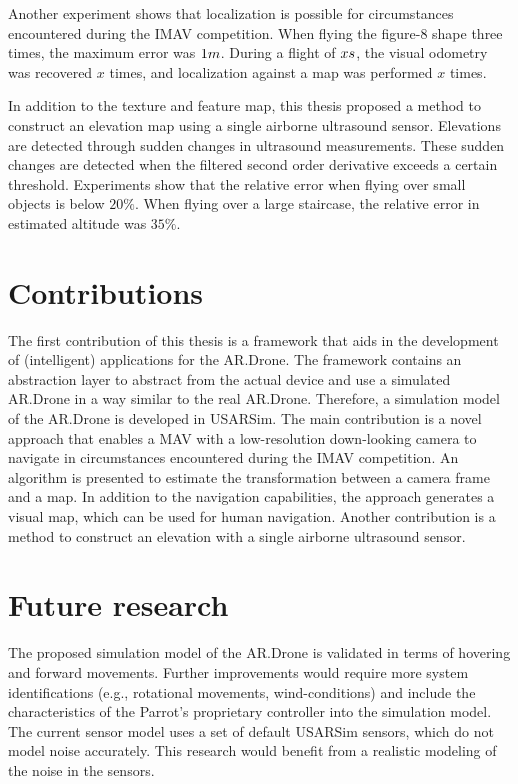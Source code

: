 Another experiment shows that localization is possible for circumstances encountered during the IMAV competition.
When flying the figure-8 shape three times, the maximum error was $1\small{m}$.
During a flight of $x\small{s}$, the visual odometry was recovered $x$ times, and localization against a map was performed $x$ times.

In addition to the texture and feature map, this thesis proposed a method to construct an elevation map using a single airborne ultrasound sensor.
Elevations are detected through sudden changes in ultrasound measurements.
These sudden changes are detected when the filtered second order derivative exceeds a certain threshold.
Experiments show that the relative error when flying over small objects is below $20\%$.
When flying over a large staircase, the relative error in estimated altitude was $35\%$.









\section{Contributions}
\label{sec:conclusions-contributions}

The first contribution of this thesis is a framework that aids in the development of (intelligent) applications for the AR.Drone.
The framework contains an abstraction layer to abstract from the actual device and use a simulated AR.Drone in a way similar to the real AR.Drone.
Therefore, a simulation model of the AR.Drone is developed in USARSim.
The main contribution is a novel approach that enables a MAV with a low-resolution down-looking camera to navigate in circumstances encountered during the IMAV competition.
An algorithm is presented to estimate the transformation between a camera frame and a map.
In addition to the navigation capabilities, the approach generates a visual map, which can be used for human navigation.
Another contribution is a method to construct an elevation with a single airborne ultrasound sensor.

\section{Future research}
\label{sec:conclusions-future}

The proposed simulation model of the AR.Drone is validated in terms of hovering and forward movements. 
Further improvements would require more system identifications (e.g., rotational movements, wind-conditions) and include the characteristics of the Parrot's proprietary controller into the simulation model. 
The current sensor model uses a set of default USARSim sensors, which do not model noise accurately.
This research would benefit from a realistic modeling of the noise in the sensors.

